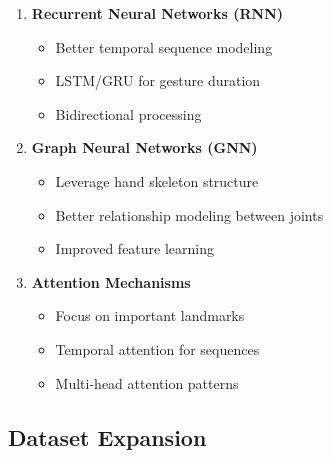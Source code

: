 \begin{enumerate}
    \item \textbf{Recurrent Neural Networks (RNN)}
    \begin{itemize}
        \item Better temporal sequence modeling
        \item LSTM/GRU for gesture duration
        \item Bidirectional processing
    \end{itemize}
    
    \item \textbf{Graph Neural Networks (GNN)}
    \begin{itemize}
        \item Leverage hand skeleton structure
        \item Better relationship modeling between joints
        \item Improved feature learning
    \end{itemize}
    
    \item \textbf{Attention Mechanisms}
    \begin{itemize}
        \item Focus on important landmarks
        \item Temporal attention for sequences
        \item Multi-head attention patterns
    \end{itemize}
\end{enumerate}

\subsection{Dataset Expansion}

